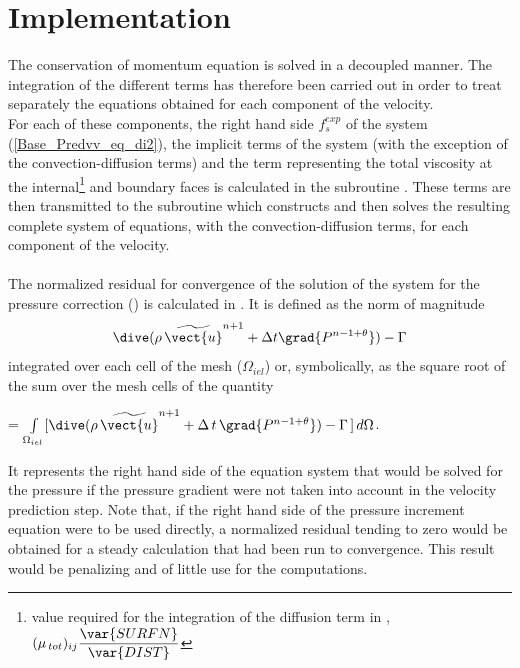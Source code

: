 \section*{Implementation}

The conservation of momentum equation is solved in a decoupled manner. The integration of the different terms has therefore been carried out in order to treat separately the equations obtained for each component of the velocity.\\
For each of these components, the right hand side $f_s^{exp}$ of the system  (\ref{Base_Predvv_eq_di2}), the implicit terms of the system (with the exception of the convection-diffusion terms) and the term representing the total viscosity at the  internal\footnote{value required for the integration of the diffusion term in , $\displaystyle(\mu_{\,tot})_{ij}\frac{\var{SURFN}}{\var{DIST}}$} and boundary faces is calculated in the subroutine . These terms are then transmitted to the subroutine  which constructs and then solves the resulting complete system of equations, with the convection-diffusion terms, for each component of the velocity.
\\\\
The normalized residual for convergence of the solution of the system for the pressure correction () is calculated in
. It is defined as the norm of magnitude
  $$\dive(\rho\,\widetilde{\vect{u}}^{n+1}+\Delta t \grad{P^{n-1+\theta}})-\Gamma$$
integrated over each cell  of the mesh ($\Omega_{iel}$) or, symbolically, as the square root of the sum over the mesh cells of the quantity
\begin{center}
=
$\int\limits_{\Omega_{iel}}[{\dive(\rho\,\widetilde{\vect{u}}^{n+1}+\Delta\,t\,\grad{P^{n-1+\theta}})
-\Gamma\,]\,d\Omega}$.
\end{center}

It represents the right hand side of the equation system that would be solved for the pressure if the pressure gradient were not taken into account in the velocity prediction step. Note that, if the right hand side of the pressure increment equation were to be used directly, a normalized residual tending to zero would be obtained for a steady calculation that had been run to convergence. This result would be penalizing and of little use for the computations.

